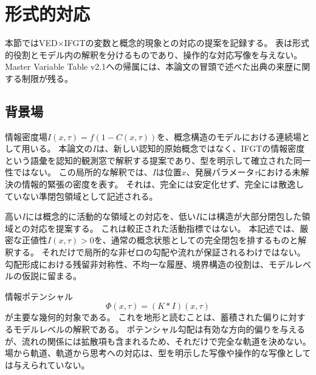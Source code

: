 \section{形式的対応}
\label{sec:formal}

本節ではVED$\times$IFGTの変数と概念的現象との対応の提案を記録する。
表は形式的役割とモデル内の解釈を分けるものであり、操作的な対応写像を与えない。
Master Variable Table v2.1への帰属には、本論文の冒頭で述べた出典の来歴に関する制限が残る。

\subsection{背景場}
情報密度場$I(x,\tau) = f(1-C(x,\tau))$を、概念構造のモデルにおける連続場として用いる。
本論文の$I$は、新しい認知的原始概念ではなく、IFGTの情報密度という語彙を認知的観測窓で解釈する提案であり、型を明示して確立された同一性ではない。
この局所的な解釈では、$I$は位置$x$、発展パラメータ$\tau$における未解決の情報的緊張の密度を表す。
それは、完全には安定化せず、完全には散逸していない準閉包領域として記述される。

高い$I$には概念的に活動的な領域との対応を、低い$I$には構造が大部分閉包した領域との対応を提案する。
これは較正された活動指標ではない。
本記述では、厳密な正値性$I(x,\tau)>0$を、通常の概念状態としての完全閉包を排するものと解釈する。
それだけで局所的な非ゼロの勾配や流れが保証されるわけではない。
勾配形成における残留非対称性、不均一な履歴、境界構造の役割は、モデルレベルの仮説に留まる。

情報ポテンシャル
\begin{equation}
  \Phi(x,\tau) = (K * I)(x,\tau)
  \label{eq:Phi_primary}
\end{equation}
が主要な幾何的対象である。
これを地形と読むことは、蓄積された偏りに対するモデルレベルの解釈である。
ポテンシャル勾配は有効な方向的偏りを与えるが、流れの関係には拡散項も含まれるため、それだけで完全な軌道を決めない。
場から軌道、軌道から思考への対応は、型を明示した写像や操作的な写像としては与えられていない。

